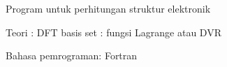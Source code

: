 Program untuk perhitungan struktur elektronik

Teori : DFT
basis set : fungsi Lagrange atau DVR

Bahasa pemrograman: Fortran



